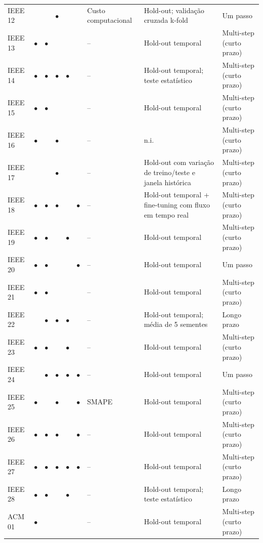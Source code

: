 {\begin{longtable}{p{1.3cm}ccccc p{2.0cm}p{3.2cm}p{2.0cm}}
IEEE 12 &  &  & $\bullet$ &  &  & Custo computacional & Hold-out; validação cruzada k-fold & Um passo \\
IEEE 13 & $\bullet$ & $\bullet$ &  &  &  & -- & Hold-out temporal & Multi-step (curto prazo) \\
IEEE 14 & $\bullet$ & $\bullet$ & $\bullet$ & $\bullet$ &  & -- & Hold-out temporal; teste estatístico & Multi-step (curto prazo) \\
IEEE 15 & $\bullet$ & $\bullet$ &  &  &  & -- & Hold-out temporal & Multi-step (curto prazo) \\
IEEE 16 & $\bullet$ &  & $\bullet$ &  &  & -- & n.i. & Multi-step (curto prazo) \\
IEEE 17 &  &  & $\bullet$ &  &  & -- & Hold-out com variação de treino/teste e janela histórica & Multi-step (curto prazo) \\
IEEE 18 & $\bullet$ & $\bullet$ & $\bullet$ &  & $\bullet$ & -- & Hold-out temporal + fine-tuning com fluxo em tempo real & Multi-step (curto prazo) \\
IEEE 19 & $\bullet$ & $\bullet$ &  & $\bullet$ &  & -- & Hold-out temporal & Multi-step (curto prazo) \\
IEEE 20 & $\bullet$ & $\bullet$ &  &  & $\bullet$ & -- & Hold-out temporal & Um passo \\
IEEE 21 & $\bullet$ & $\bullet$ &  &  &  & -- & Hold-out temporal & Multi-step (curto prazo) \\
IEEE 22 &  & $\bullet$ & $\bullet$ & $\bullet$ &  & -- & Hold-out temporal; média de 5 sementes & Longo prazo \\
IEEE 23 & $\bullet$ & $\bullet$ &  & $\bullet$ &  & -- & Hold-out temporal & Multi-step (curto prazo) \\
IEEE 24 &  & $\bullet$ & $\bullet$ & $\bullet$ & $\bullet$ & -- & Hold-out temporal & Um passo \\
IEEE 25 & $\bullet$ &  & $\bullet$ &  & $\bullet$ & SMAPE & Hold-out temporal & Multi-step (curto prazo) \\
IEEE 26 & $\bullet$ & $\bullet$ & $\bullet$ &  & $\bullet$ & -- & Hold-out temporal & Multi-step (curto prazo) \\
IEEE 27 & $\bullet$ & $\bullet$ & $\bullet$ & $\bullet$ & $\bullet$ & -- & Hold-out temporal & Multi-step (curto prazo) \\
IEEE 28 & $\bullet$ & $\bullet$ &  & $\bullet$ &  & -- & Hold-out temporal; teste estatístico & Longo prazo \\
ACM 01 & $\bullet$ &  &  &  &  & -- & Hold-out temporal & Multi-step (curto prazo) \\

\end{longtable}}
